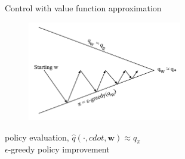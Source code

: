 \bgroup
\begin{frame}{Control with value function approximation}
\begin{figure}
\centering
\includegraphics[width=0.6\textwidth]{img/vfa_control}
\end{figure}
 policy evaluation, $\hat{q}(\cdot, cdot, \textbf{w}) \approx q_{\pi}$\\
 $\epsilon$-greedy policy improvement
\end{frame}
\egroup